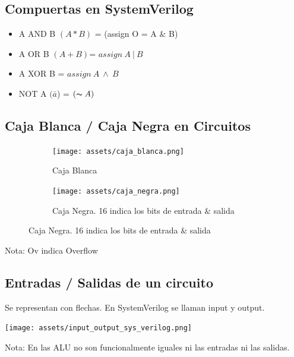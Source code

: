 \documentclass[10pt,a4paper]{article}
\begin{document}
\subsection*{Compuertas en SystemVerilog}
\begin{itemize}
    \item A AND B \((A \ast B)\) = (assign O = A \& B)
    \item A OR B \((A + B)\)= \(assign \ A \ | \ B\)
    \item A XOR B = \(assign \ A \ \land \ B\)
    \item NOT A \((\bar{a}\)) = \((\thicksim A)\)
\end{itemize} 

\subsection*{Caja Blanca / Caja Negra en Circuitos}
\begin{figure}[h]
    \begin{subfigure}{0.5\textwidth}
        \centering
    \texttt{[image: assets/caja\_blanca.png]}
    \caption{Caja Blanca}
    \label{fig:cajaBlanca}
    \end{subfigure}
    \begin{subfigure}{0.6\textwidth}
    \centering
    \texttt{[image: assets/caja\_negra.png]}
    \caption{Caja Negra. 16 indica los bits de entrada \(\&\) salida}
    \label{fig:cajaNegra}
    \end{subfigure}
    \end{figure}
Nota: Ov indica Overflow

\subsection*{Entradas / Salidas de un circuito}
Se representan con flechas. En SystemVerilog se llaman input y output.\\
\begin{minipage}[b]{0.5\textwidth}
    \texttt{[image: assets/input\_output\_sys\_verilog.png]}
    \label{fig:input_output_sys_verilog}
\end{minipage}

Nota: En las ALU no son funcionalmente iguales ni las entradas ni las salidas.
\end{document}
